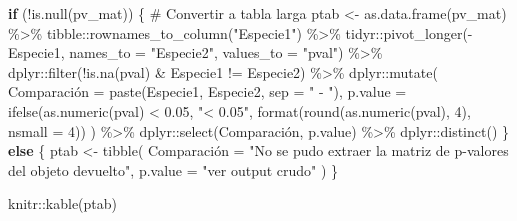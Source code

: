 \documentclass[
  spanish,
  11pt,
  a4paper,
  DIV=11,
  numbers=noendperiod]{scrartcl}
\newenvironment{Shaded}{\begin{snugshade}}{\end{snugshade}}
\newcommand{\AttributeTok}[1]{\textcolor[rgb]{0.40,0.45,0.13}{#1}}
\newcommand{\CommentTok}[1]{\textcolor[rgb]{0.37,0.37,0.37}{#1}}
\newcommand{\ControlFlowTok}[1]{\textcolor[rgb]{0.00,0.23,0.31}{\textbf{#1}}}
\newcommand{\DecValTok}[1]{\textcolor[rgb]{0.68,0.00,0.00}{#1}}
\newcommand{\FloatTok}[1]{\textcolor[rgb]{0.68,0.00,0.00}{#1}}
\newcommand{\FunctionTok}[1]{\textcolor[rgb]{0.28,0.35,0.67}{#1}}
\newcommand{\NormalTok}[1]{\textcolor[rgb]{0.00,0.23,0.31}{#1}}
\newcommand{\OtherTok}[1]{\textcolor[rgb]{0.00,0.23,0.31}{#1}}
\newcommand{\SpecialCharTok}[1]{\textcolor[rgb]{0.37,0.37,0.37}{#1}}
\newcommand{\StringTok}[1]{\textcolor[rgb]{0.13,0.47,0.30}{#1}}
\begin{document}
\begin{Shaded}
\begin{Highlighting}[numbers=left,,]
\ControlFlowTok{if}\NormalTok{ (}\SpecialCharTok{!}\FunctionTok{is.null}\NormalTok{(pv\_mat)) \{}
  \CommentTok{\# Convertir a tabla larga}
\NormalTok{  ptab }\OtherTok{\textless{}{-}} \FunctionTok{as.data.frame}\NormalTok{(pv\_mat) }\SpecialCharTok{\%\textgreater{}\%}
\NormalTok{    tibble}\SpecialCharTok{::}\FunctionTok{rownames\_to\_column}\NormalTok{(}\StringTok{"Especie1"}\NormalTok{) }\SpecialCharTok{\%\textgreater{}\%}
\NormalTok{    tidyr}\SpecialCharTok{::}\FunctionTok{pivot\_longer}\NormalTok{(}\SpecialCharTok{{-}}\NormalTok{Especie1, }\AttributeTok{names\_to =} \StringTok{"Especie2"}\NormalTok{, }
                        \AttributeTok{values\_to =} \StringTok{"pval"}\NormalTok{) }\SpecialCharTok{\%\textgreater{}\%}
\NormalTok{    dplyr}\SpecialCharTok{::}\FunctionTok{filter}\NormalTok{(}\SpecialCharTok{!}\FunctionTok{is.na}\NormalTok{(pval) }\SpecialCharTok{\&}\NormalTok{ Especie1 }\SpecialCharTok{!=}\NormalTok{ Especie2) }\SpecialCharTok{\%\textgreater{}\%}
\NormalTok{    dplyr}\SpecialCharTok{::}\FunctionTok{mutate}\NormalTok{(}
\NormalTok{      Comparación }\OtherTok{=} \FunctionTok{paste}\NormalTok{(Especie1, Especie2, }\AttributeTok{sep =} \StringTok{" {-} "}\NormalTok{),}
      \AttributeTok{p.value =} \FunctionTok{ifelse}\NormalTok{(}\FunctionTok{as.numeric}\NormalTok{(pval) }\SpecialCharTok{\textless{}} \FloatTok{0.05}\NormalTok{, }\StringTok{"\textless{} 0.05"}\NormalTok{, }
                       \FunctionTok{format}\NormalTok{(}\FunctionTok{round}\NormalTok{(}\FunctionTok{as.numeric}\NormalTok{(pval), }\DecValTok{4}\NormalTok{), }\AttributeTok{nsmall =} \DecValTok{4}\NormalTok{))}
\NormalTok{    ) }\SpecialCharTok{\%\textgreater{}\%}
\NormalTok{    dplyr}\SpecialCharTok{::}\FunctionTok{select}\NormalTok{(Comparación, p.value) }\SpecialCharTok{\%\textgreater{}\%}
\NormalTok{    dplyr}\SpecialCharTok{::}\FunctionTok{distinct}\NormalTok{()}
\NormalTok{\} }\ControlFlowTok{else}\NormalTok{ \{}
\NormalTok{  ptab }\OtherTok{\textless{}{-}} \FunctionTok{tibble}\NormalTok{(}
\NormalTok{    Comparación }\OtherTok{=} \StringTok{"No se pudo extraer la matriz de p{-}valores }
\StringTok{    del objeto devuelto"}\NormalTok{,}
    \AttributeTok{p.value =} \StringTok{"ver output crudo"}
\NormalTok{  )}
\NormalTok{\}}

\NormalTok{knitr}\SpecialCharTok{::}\FunctionTok{kable}\NormalTok{(ptab)}
\end{Highlighting}
\end{Shaded}
\end{document}
